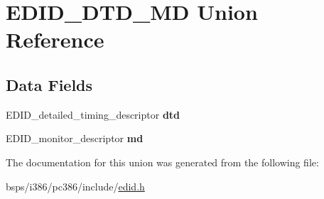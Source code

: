 \hypertarget{unionEDID__DTD__MD}{}\section{E\+D\+I\+D\+\_\+\+D\+T\+D\+\_\+\+MD Union Reference}
\label{unionEDID__DTD__MD}
\subsection*{Data Fields}
\begin{DoxyCompactItemize}
\item 
\mbox{\label{unionEDID__DTD__MD_af8c4f4692609cdace29862ea51ace98b}} 
E\+D\+I\+D\+\_\+detailed\+\_\+timing\+\_\+descriptor {\bfseries dtd}
\item 
\mbox{\label{unionEDID__DTD__MD_a3c1a6241246381306d595988604856de}} 
E\+D\+I\+D\+\_\+monitor\+\_\+descriptor {\bfseries md}
\end{DoxyCompactItemize}


The documentation for this union was generated from the following file\+:\begin{DoxyCompactItemize}
\item 
bsps/i386/pc386/include/\mbox{\hyperlink{edid_8h}{edid.\+h}}\end{DoxyCompactItemize}
